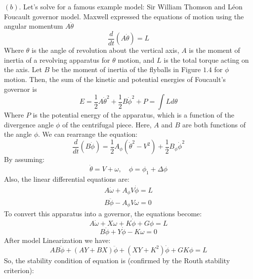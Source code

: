 \documentclass[11pt]{scrartcl} %
\begin{document}
$(b) .$ \newline
Let’s solve for a famous example model: Sir William Thomson and Léon Foucault governor model. Maxwell expressed the equations of motion using the angular momentum $A \dot{\theta}$
\begin{equation}
\frac{d}{d t}(A \dot{\theta})=L
\end{equation}
Where $\theta$ is the angle of revolution about the vertical axis, $A$ is the moment of inertia of a revolving apparatus for $\theta$ motion, and $L$ is the total torque acting on the axis. Let $B$ be the moment of inertia of the flyballs in Figure $1.4 $ for $\phi$ motion. Then, the sum of the kinetic and potential energies of Foucault's governor is
\begin{equation}
E=\frac{1}{2} A \dot{\theta}^{2}+\frac{1}{2} B \dot{\phi}^{2}+P=\int L d \theta
\end{equation}
Where $P$ is the potential energy of the apparatus, which is a function of the divergence angle $\phi$ of the centrifugal piece. Here, $A$ and $B$ are both functions of the angle $\phi$. We can rearrange the equation:
\begin{equation}
\frac{d}{d t}(B \dot{\phi})=\frac{1}{2} A_{\phi}\left(\dot{\theta}^{2}-V^{2}\right)+\frac{1}{2} B_{\phi} \dot{\phi}^{2}
\end{equation}
By assuming:
\begin{equation}
\dot{\theta}= V+\omega, \quad \phi= \phi_{1}+\Delta\phi
\end{equation}
Also, the linear differential equations are:
\begin{equation}
\begin{array}{l}
A \dot{\omega}+A_{\phi} V \dot{\phi}=L \\
B \ddot{\phi}-A_{\phi} V \omega=0
\end{array}
\end{equation}
To convert this apparatus into a governor, the equations become:
\begin{equation}
A \dot{\omega}+X \omega+K \dot{\phi}+G \phi=L
\end{equation}
\begin{equation}
B \ddot{\phi}+Y \dot{\phi}-K \omega=0
\end{equation}
After model Linearization we have:
\begin{equation}
A B \ddot{\phi}+(A Y+B X) \ddot{\phi}+\left(X Y+K^{2}\right) \dot{\phi}+G K \phi=L
\end{equation}
So, the stability condition of equation is (confirmed by the Routh stability criterion):
\end{document}
